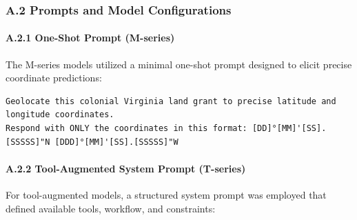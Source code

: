 \documentclass[
  10pt,
  twocolumn]{article}
\begin{document}
\subsubsection{A.2 Prompts and Model Configurations}\label{sec:prompts}

\paragraph{A.2.1 One-Shot Prompt
(M-series)}\label{a.2.1-one-shot-prompt-m-series}

The M-series models utilized a minimal one-shot prompt designed to
elicit precise coordinate predictions:

\begin{lstlisting}
Geolocate this colonial Virginia land grant to precise latitude and longitude coordinates.
Respond with ONLY the coordinates in this format: [DD]°[MM]'[SS].[SSSSS]"N [DDD]°[MM]'[SS].[SSSSS]"W
\end{lstlisting}

\paragraph{A.2.2 Tool-Augmented System Prompt
(T-series)}\label{a.2.2-tool-augmented-system-prompt-t-series}

For tool-augmented models, a structured system prompt was employed that
defined available tools, workflow, and constraints:
\end{document}
